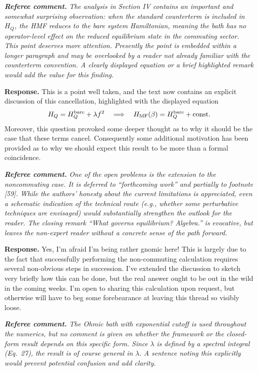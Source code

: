 \documentclass[11pt]{article}
\newcommand{\RC}[1]{\textbf{\textit{Referee comment.}} \textit{#1}}
\newcommand{\AR}[1]{\textbf{Response.} #1}
\begin{document}
\RC{The analysis in Section IV contains an important and somewhat surprising observation: when the standard counterterm is included in $H_Q$, the HMF reduces to the bare system Hamiltonian, meaning the bath has no operator-level effect on the reduced equilibrium state in the commuting sector. This point deserves more attention. Presently the point is embedded within a longer paragraph and may be overlooked by a reader not already familiar with the counterterm convention. A clearly displayed equation or a brief highlighted remark would add the value for this finding.}

\AR{This is a point well taken, and the text now contains an explicit discussion of this cancellation, highlighted with the displayed equation
\[
    H_Q=H_Q^{\rm bare}+\lambda f^2
    \quad\Longrightarrow\quad
    H_{\rm MF}(\beta)=H_Q^{\rm bare}+\mathrm{const}.
\]
 Moreover, this question provoked some deeper thought as to why it should be the case that these terms cancel. Consequently some additional motivation has been provided as to why we should expect this result to be more than a formal coincidence.}


\RC{One of the open problems is the extension to the noncommuting case. It is deferred to ``forthcoming work'' and partially to footnote [59]. While the authors' honesty about the current limitations is appreciated, even a schematic indication of the technical route (e.g., whether some perturbative techniques are envisaged) would substantially strengthen the outlook for the reader. The closing remark ``What governs equilibrium? Algebra.'' is evocative, but leaves the non-expert reader without a concrete sense of the path forward.}

\AR{Yes, I'm afraid I'm being rather gnomic here! This is largely due to the fact that successfully performing the non-commuting calculation requires several non-obvious steps in succession. I've extended the discussion to sketch very briefly how this can be done, but the real answer ought to be out in the wild in the coming weeks. I'm open to sharing this calculation upon request, but otherwise will have to beg some forebearance at leaving this thread so visibly loose.}


\RC{The Ohmic bath with exponential cutoff is used throughout the numerics, but no comment is given on whether the framework or the closed-form result depends on this specific form. Since $\lambda$ is defined by a spectral integral (Eq.~27), the result is of course general in $\lambda$. A sentence noting this explicitly would prevent potential confusion and add clarity.}
\end{document}
